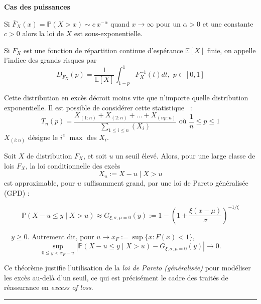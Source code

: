 \begin{f}
	
	\textbf{Cas des puissances} 
	
	Si $\overline{F}_{X}(x)=\mathbb{P}(X > x)\sim c\ x^{-\alpha}$
		quand $x \to \infty $ pour un $\alpha > 0 $ et une constante $c > 0 $ alors la loi de $X$
		est sous-exponentielle.
	
		Si $F_X$ est une fonction de répartition continue d'espérance $\mathbb{E}[X]$ finie, on appelle l'indice des grands risques par
		$$
		D_{F_X}(p)=\frac{1}{\mathbb{E}[X]}\int_{1-p}^{1} F_X^{-1}(t)dt,\, \, p\in [0,1]
		$$

	Cette distribution en excès décroit moins vite que n'importe quelle distribution exponentielle.
	Il est possible de considérer cette statistique ~:
	$$
	T_n(p)=\frac{X_{(1:n)}+X_{(2:n)}+\ldots + X_{(np:n)}}{\sum_{1\leq i\leq n}(X_i)} \mbox{ où } \frac{1}{n}\leq p\leq 1
	$$
	$X_{(i:n)}$ désigne le $i^e$ $\max $ des $X_i$.

\end{f}
\begin{f}
	Soit $X$ de distribution $F_X$, et soit $u$ un seuil élevé. Alors, pour une large classe de lois $F_X$, la loi conditionnelle des excès
	\[
	X_u := X - u \mid X > u
	\]
	est approximable, pour $u$ suffisamment grand, par une loi de Pareto généralisée (GPD) :
	
	\[
	\mathbb{P}(X - u \le y \mid X > u) \approx G_{\xi, \sigma, \mu=0}(y) :=  1 - \left(1+ \frac{\xi(x-\mu)}{\sigma}\right)^{-1/\xi} 
	\]
	
	$\quad y \ge 0$. Autrement dit, pour $u \to x_F := \sup\{x : F(x) < 1\}$,
	\[
	\sup_{0 \le y < x_F - u} \left| \mathbb{P}(X - u \le y \mid X > u) - G_{\xi,\sigma,\mu=0}(y) \right| \to 0.
	\]
	
	Ce théorème justifie l’utilisation de la \textit{loi de Pareto (généralisée)} pour modéliser les excès au-delà d’un seuil, ce qui est précisément le cadre des traités de réassurance en \textit{excess of loss}. 
\end{f}
\hrule


